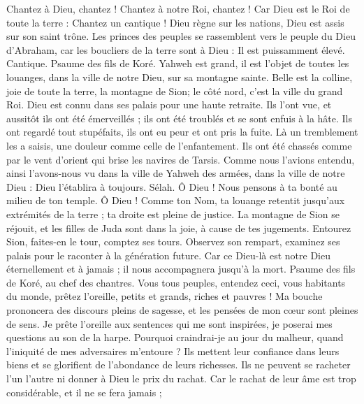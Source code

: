 \begin{multicols}{2}
Chantez à Dieu, chantez ! Chantez à notre Roi, chantez !
Car Dieu est le Roi de toute la terre : Chantez un cantique !
Dieu règne sur les nations, Dieu est assis sur son saint trône.
Les princes des peuples se rassemblent vers le peuple du Dieu d'Abraham, car les boucliers de la terre sont à Dieu : Il est puissamment élevé.
\VerseOne{}Cantique. Psaume des fils de Koré.
Yahweh est grand, il est l'objet de toutes les louanges, dans la ville de notre Dieu, sur sa montagne sainte.
Belle est la colline, joie de toute la terre, la montagne de Sion; le côté nord, c'est la ville du grand Roi.
Dieu est connu dans ses palais pour une haute retraite.
Ils l'ont vue, et aussitôt ils ont été émerveillés ; ils ont été troublés et se sont enfuis à la hâte.
Ils ont regardé tout stupéfaits, ils ont eu peur et ont pris la fuite.
Là un tremblement les a saisis, une douleur comme celle de l'enfantement.
Ils ont été chassés comme par le vent d'orient qui brise les navires de Tarsis.
Comme nous l'avions entendu, ainsi l'avons-nous vu dans la ville de Yahweh des armées, dans la ville de notre Dieu : Dieu l'établira à toujours. Sélah.
Ô Dieu ! Nous pensons à ta bonté au milieu de ton temple.
Ô Dieu ! Comme ton Nom, ta louange retentit jusqu'aux extrémités de la terre ; ta droite est pleine de justice.
La montagne de Sion se réjouit, et les filles de Juda sont dans la joie, à cause de tes jugements.
Entourez Sion, faites-en le tour, comptez ses tours.
Observez son rempart, examinez ses palais pour le raconter à la génération future.
Car ce Dieu-là est notre Dieu éternellement et à jamais ; il nous accompagnera jusqu'à la mort.
\VerseOne{}Psaume des fils de Koré, au chef des chantres.
Vous tous peuples, entendez ceci, vous habitants du monde, prêtez l'oreille,
petits et grands, riches et pauvres !
Ma bouche prononcera des discours pleins de sagesse, et les pensées de mon cœur sont pleines de sens.
Je prête l'oreille aux sentences qui me sont inspirées, je poserai mes questions au son de la harpe.
Pourquoi craindrai-je au jour du malheur, quand l'iniquité de mes adversaires m'entoure ?
Ils mettent leur confiance dans leurs biens et se glorifient de l'abondance de leurs richesses.
Ils ne peuvent se racheter l'un l'autre ni donner à Dieu le prix du rachat.
Car le rachat de leur âme est trop considérable, et il ne se fera jamais ;

\end{multicols}
